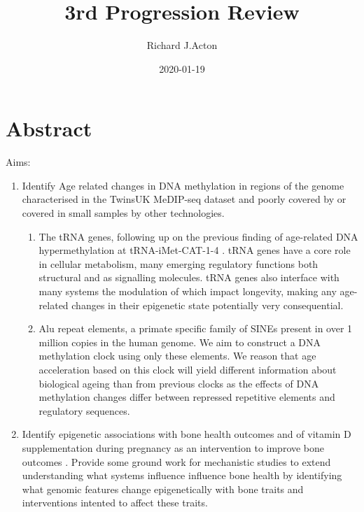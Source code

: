 \documentclass[]{book}
\title{3rd Progression Review}
\subtitle{The Epigenomics of Human Ageing

Academic Unit - Human Development and Health

Supervisors - Chris Bell, Karen Lillycrop and Cyrus Cooper}
\author{Richard J.Acton}
\date{2020-01-19}
\providecommand{\tightlist}{%
  \setlength{\itemsep}{0pt}\setlength{\parskip}{0pt}}
\begin{document}
\maketitle

{
\setcounter{tocdepth}{1}
\tableofcontents
}
\hypertarget{abstract}{%
\chapter*{Abstract}\label{abstract}}

Aims:

\begin{enumerate}
\def\labelenumi{\arabic{enumi}.}
\item
  Identify Age related changes in DNA methylation in regions of the genome characterised in the TwinsUK MeDIP-seq dataset and poorly covered by or covered in small samples by other technologies.

  \begin{enumerate}
  \def\labelenumii{\alph{enumii}.}
  \tightlist
  \item
    The tRNA genes, following up on the previous finding of age-related DNA hypermethylation at tRNA-iMet-CAT-1-4 \citep{Bell2016}. tRNA genes have a core role in cellular metabolism, many emerging regulatory functions both structural and as signalling molecules. tRNA genes also interface with many systems the modulation of which impact longevity, making any age-related changes in their epigenetic state potentially very consequential.
  \item
    Alu repeat elements, a primate specific family of SINEs present in over 1 million copies in the human genome. We aim to construct a DNA methylation clock using only these elements. We reason that age acceleration based on this clock will yield different information about biological ageing than from previous clocks as the effects of DNA methylation changes differ between repressed repetitive elements and regulatory sequences.
  \end{enumerate}
\item
  Identify epigenetic associations with bone health outcomes and of vitamin D supplementation during pregnancy as an intervention to improve bone outcomes \citep{Harvey2012a, Cooper2016}. Provide some ground work for mechanistic studies to extend understanding what systems influence influence bone health by identifying what genomic features change epigenetically with bone traits and interventions intented to affect these traits.
\end{enumerate}
\end{document}
